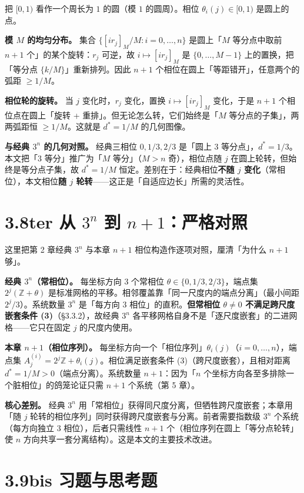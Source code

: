 \documentclass[a4paper,11pt,openany]{ctexbook}
\numberwithin{equation}{chapter}
\numberwithin{figure}{chapter}
\numberwithin{table}{chapter}
\begin{document}
把 $[0,1)$ 看作一个周长为 $1$ 的圆（模 $1$ 的圆周）。相位 $\theta_i(j)\in[0,1)$ 是圆上的点。

\textbf{模 $M$ 的均匀分布。} 集合 $\{[ir_j]_M/M:i=0,\dots,n\}$ 是圆上「$M$ 等分点中取前 $n+1$ 个」的某个旋转：$r_j$ 可逆，故 $i\mapsto[ir_j]_M$ 是 $\{0,\dots,M-1\}$ 上的置换，把「等分点 $\{k/M\}$」重新排列。因此 $n+1$ 个相位在圆上「等距错开」，任意两个的弧距 $\ge1/M$。

\textbf{相位轮的旋转。} 当 $j$ 变化时，$r_j$ 变化，置换 $i\mapsto[ir_j]_M$ 变化，于是 $n+1$ 个相位点在圆上「旋转 + 重排」。但无论怎么转，它们始终是「$M$ 等分点的子集」，两两弧距恒 $\ge1/M$。这就是 $d^*=1/M$ 的几何图像。

\textbf{与经典 $3^n$ 的几何对照。} 经典三相位 $0,1/3,2/3$ 是「圆上 $3$ 等分点」，$d^*=1/3$。本文把「$3$ 等分」推广为「$M$ 等分」（$M>n$ 奇），相位点随 $j$ 在圆上轮转，但始终是等分点子集，故 $d^*=1/M$ 恒定。差别在于：经典相位\textbf{不随 $j$ 变化}（常相位），本文相位\textbf{随 $j$ 轮转}——这正是「自适应边长」所需的灵活性。

\section{3.8ter 从 $3^n$ 到 $n+1$：严格对照}

这里把第 2 章经典 $3^n$ 与本章 $n+1$ 相位构造作逐项对照，厘清「为什么 $n+1$ 够」。

\textbf{经典 $3^n$（常相位）。} 每坐标方向 $3$ 个常相位 $\theta\in\{0,1/3,2/3\}$，端点集 $2^j(\mathbb Z+\theta)$ 是标准网格的平移。相邻覆盖靠「同一尺度内的端点分离」（最小间距 $2^j/3$）。系统数量 $3^n$ 是「每方向 $3$ 相位」的直积。\textbf{但常相位 $\theta\neq0$ 不满足跨尺度嵌套条件 (3)}（§3.3.2），故经典 $3^n$ 各平移网格自身不是「逐尺度嵌套」的二进网格——它只在固定 $j$ 的尺度内使用。

\textbf{本章 $n+1$（相位序列）。} 每坐标方向一个「相位序列」$\theta_i(j)$（$i=0,\dots,n$），端点集 $A_j^{(i)}=2^j\mathbb Z+\theta_i(j)$。相位满足嵌套条件 (3)（跨尺度嵌套），且相对距离 $d^*=1/M>0$（端点分离）。系统数量 $n+1$：因为「$n$ 个坐标方向各至多排除一个脏相位」的鸽笼论证只需 $n+1$ 个系统（第 5 章）。

\textbf{核心差别。} 经典 $3^n$ 用「常相位」获得同尺度分离，但牺牲跨尺度嵌套；本章用「随 $j$ 轮转的相位序列」同时获得跨尺度嵌套与分离。前者需要指数级 $3^n$ 个系统（每方向独立 $3$ 相位），后者只需线性 $n+1$ 个（相位序列在圆上「等分点轮转」使 $n$ 方向共享一套分离结构）。这是本文的主要技术改进。

\section{3.9bis 习题与思考题}
\end{document}
